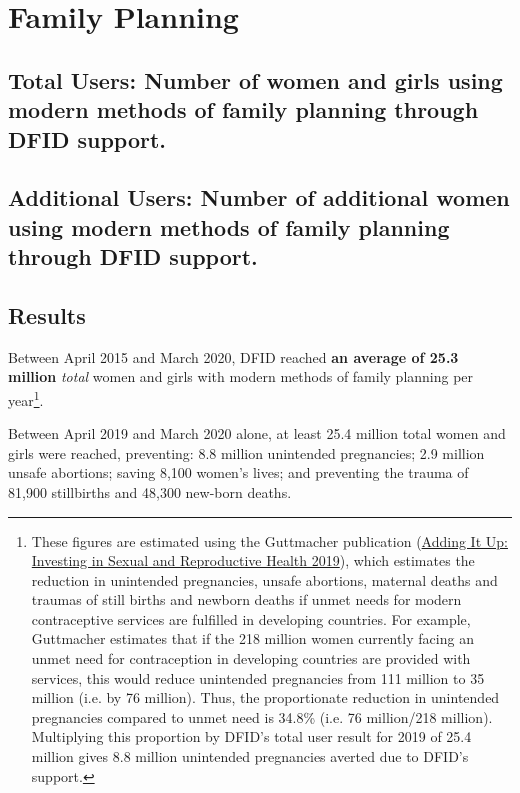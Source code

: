 \chapter{Family Planning}

\section*{Total Users: Number of women and girls using modern methods of family planning through DFID support.}

\section*{Additional Users: Number of additional women using modern methods of family planning through DFID support.}


\thispagestyle{empty}


\section{Results}

Between April 2015 and March 2020, DFID reached \textbf{
an average of 25.3 million
} \textsl{total} women and girls with modern methods of family planning per year\footnote{These figures are estimated using the Guttmacher publication (\href{https://www.guttmacher.org/report/adding-it-up-investing-in-sexual-reproductive-health-2019-methodology}{Adding It Up: Investing in Sexual and Reproductive Health 2019}), which estimates the reduction in unintended pregnancies, unsafe abortions, maternal deaths and traumas of still births and newborn deaths if unmet needs for modern contraceptive services are fulfilled in developing countries. For example, Guttmacher estimates that if the 218 million women currently facing an unmet need for contraception in developing countries are provided with services, this would reduce unintended pregnancies from 111 million to 35 million (i.e. by 76 million). Thus, the proportionate reduction in unintended pregnancies compared to unmet need is 34.8\% (i.e. 76 million/218 million). Multiplying this proportion by DFID's total user result for 2019 of 25.4 million gives 8.8 million unintended pregnancies averted due to DFID's support.}. %

Between April 2019 and March 2020 alone, at least
25.4
million total women and girls were reached, preventing: 8.8 million unintended pregnancies; 2.9 million unsafe abortions; saving 8,100 women's lives; and preventing the trauma of 81,900 stillbirths and 48,300 new-born deaths. %

